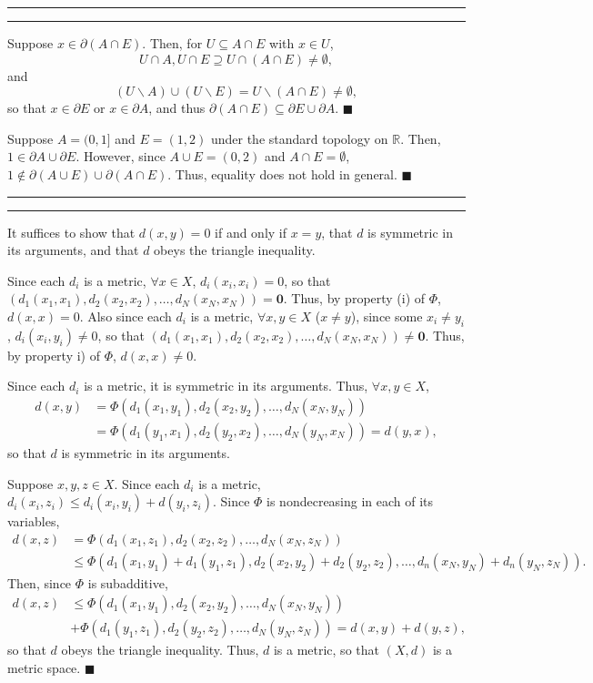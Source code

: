 \documentclass[11pt]{article}
\newcounter{questionCounter}
\newcounter{partCounter}[questionCounter]
\newenvironment{question}[2][\arabic{questionCounter}]{%
    \setcounter{partCounter}{0}%
    \vspace{.25in} \hrule \vspace{0.5em}%
        \noindent{\bf #2}%
    \vspace{0.8em} \hrule \vspace{.10in}%
    \addtocounter{questionCounter}{1}%
}{}
\renewcommand{\qed}{\quad $\blacksquare$}
\newcommand{\bzero}{\mathbf{0}}
\newcommand{\sminus}{\backslash}
\begin{document}
\begin{question}{Problem 3}
\begin{enumerate}[(i)]
Suppose $x \in \partial(A \cap E)$. Then, for $U \subseteq A \cap E$ with
$x \in U$,
\[U \cap A,U \cap E \supseteq U \cap (A \cap E) \neq \emptyset,\]
and
\[(U \sminus A) \cup (U \sminus E) = U \sminus(A \cap E) \neq \emptyset,\]
so that $x \in \partial E$ or $x \in \partial A$, and thus
$\partial(A \cap E) \subseteq \partial E \cup \partial A$. \qed

Suppose $A = (0,1]$ and $E = (1,2)$ under the standard topology on
$\mathbb{R}$. Then, $1 \in \partial A \cup \partial E$. However, since
$A \cup E = (0,2)$ and $A \cap E = \emptyset$,
$1 \not \in \partial(A \cup E) \cup \partial(A \cap E)$. Thus, equality does
not hold in general. \qed
\end{enumerate}
\end{question}

\begin{question}{Problem 4}
It suffices to show that $d(x,y) = 0$ if and only if $x = y$, that $d$ is
symmetric in its arguments, and that $d$ obeys the triangle inequality.

Since each $d_i$ is a metric, $\forall x \in X$, $d_i(x_i,x_i) = 0$, so that
$(d_1(x_1,x_1),d_2(x_2,x_2),\ldots,d_N(x_N,x_N)) = \bzero$. Thus, by property
(i) of $\Phi$, $d(x,x) = 0$.
Also since each $d_i$ is a metric, $\forall x,y \in X$ ($x \neq y$), since
some $x_i \neq y_i$, $d_i(x_i,y_i) \neq 0$, so that
$(d_1(x_1,x_1),d_2(x_2,x_2),\ldots,d_N(x_N,x_N)) \neq \bzero$. Thus, by
property i) of $\Phi$, $d(x,x) \neq 0$.

Since each $d_i$ is a metric, it is symmetric in its arguments. Thus,
$\forall x,y \in X$,
\begin{align*}
d(x,y)
 & = \Phi(d_1(x_1,y_1),d_2(x_2,y_2),\ldots,d_N(x_N,y_N)) \\
 & = \Phi(d_1(y_1,x_1),d_2(y_2,x_2),\ldots,d_N(y_N,x_N))
 = d(y,x),
\end{align*}
so that $d$ is symmetric in its arguments.

Suppose $x,y,z \in X$. Since each $d_i$ is a metric,
$d_i(x_i,z_i) \leq d_i(x_i,y_i) + d(y_i,z_i)$.
Since $\Phi$ is nondecreasing in each of its variables,
\begin{align*}
d(x,z)
 & =    \Phi(d_1(x_1,z_1),d_2(x_2,z_2),\ldots,d_N(x_N,z_N)) \\
 & \leq \Phi(d_1(x_1,y_1) + d_1(y_1,z_1),
          d_2(x_2,y_2) + d_2(y_2,z_2),
          \ldots,
          d_n(x_N,y_N) + d_n(y_N,z_N)).
\end{align*}
Then, since $\Phi$ is subadditive,
\begin{align*}
d(x,z)
 & \leq \Phi(d_1(x_1,y_1),d_2(x_2,y_2),\ldots,d_N(x_N,y_N))     \\
 & +    \Phi(d_1(y_1,z_1),d_2(y_2,z_2),\ldots,d_N(y_N,z_N))
 =    d(x,y) + d(y,z),
\end{align*}
so that $d$ obeys the triangle inequality.
Thus, $d$ is a metric, so that $(X,d)$ is a metric space. \qed


\end{question}
\end{document}

